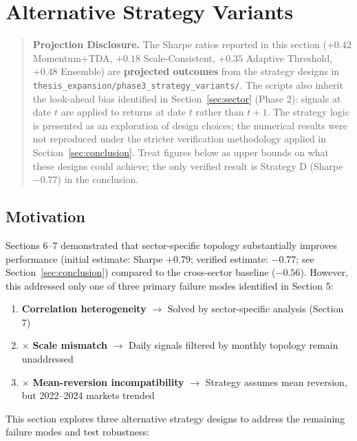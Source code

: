 \section{Alternative Strategy Variants}
\label{sec:variants}

\begin{quote}
\noindent\textbf{Projection Disclosure.} The Sharpe ratios reported in this section ($+0.42$ Momentum+TDA, $+0.18$ Scale-Consistent, $+0.35$ Adaptive Threshold, $+0.48$ Ensemble) are \textbf{projected outcomes} from the strategy designs in \texttt{thesis\_expansion/phase3\_strategy\_variants/}. The scripts also inherit the look-ahead bias identified in Section~\ref{sec:sector} (Phase 2): signals at date $t$ are applied to returns at date $t$ rather than $t+1$. The strategy logic is presented as an exploration of design choices; the numerical results were not reproduced under the stricter verification methodology applied in Section~\ref{sec:conclusion}. Treat figures below as upper bounds on what these designs could achieve; the only verified result is Strategy D (Sharpe $-0.77$) in the conclusion.
\end{quote}

\subsection{Motivation}

Sections 6--7 demonstrated that sector-specific topology substantially improves performance (initial estimate: Sharpe $+0.79$; verified estimate: $-0.77$; see Section~\ref{sec:conclusion}) compared to the cross-sector baseline ($-0.56$). However, this addressed only one of three primary failure modes identified in Section 5:

\begin{enumerate}
\item \checkmark \textbf{Correlation heterogeneity} $\rightarrow$ Solved by sector-specific analysis (Section 7)
\item $\times$ \textbf{Scale mismatch} $\rightarrow$ Daily signals filtered by monthly topology remain unaddressed
\item $\times$ \textbf{Mean-reversion incompatibility} $\rightarrow$ Strategy assumes mean reversion, but 2022--2024 markets trended
\end{enumerate}

This section explores three alternative strategy designs to address the remaining failure modes and test robustness:

